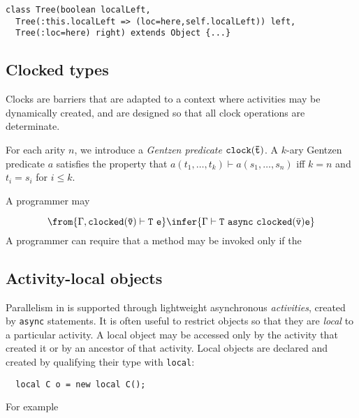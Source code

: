 {\footnotesize
\begin{verbatim}
class Tree(boolean localLeft,
  Tree(:this.localLeft => (loc=here,self.localLeft)) left, 
  Tree(:loc=here) right) extends Object {...}
\end{verbatim}}

\subsection{Clocked types}

Clocks are barriers that are adapted to a context where activities may be
dynamically created, and are designed so that all clock operations are
determinate.

For each arity $n$, we introduce a {\em Gentzen predicate} ${\tt
clock(\bar{t})}$. A $k$-ary Gentzen predicate $a$ satisfies the
property that $a(t_1,\ldots, t_k) \vdash a(s_1,\ldots,s_n)$ iff $k=n$
and $t_i=s_i$ for $i\leq k$.

A programmer may

$$
\from{\Gamma, {\tt clocked(\bar{\tt v})} \vdash {\tt T}\ {\tt e}}
\infer{\Gamma \vdash {\tt T}\ {\tt async}\ {\tt clocked}(\bar{\tt v}) {\tt e}}
$$
A programmer can require that a method may be invoked only if the 



\subsection{Activity-local objects}

Parallelism in \Xten{} is supported through lightweight asynchronous {\em
activities}, created by {\tt async} statements.
It is often useful to restrict objects so that they are {\em local} to a
particular activity.
A local object may be accessed only by
the activity that created it or by an ancestor of that activity.
Local objects are declared and created by qualifying their type
with {\tt local}:
{\footnotesize
\begin{verbatim}
  local C o = new local C();
\end{verbatim}}
For example


